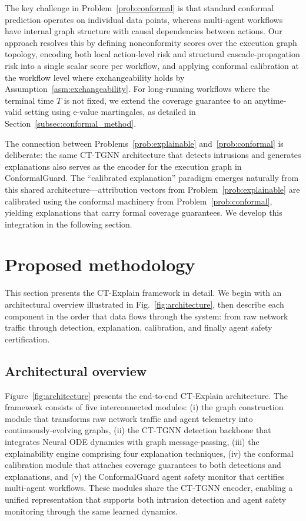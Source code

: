 \documentclass[preprint,review,12pt]{elsarticle}
\begin{document}
The key challenge in Problem~\ref{prob:conformal} is that standard conformal prediction operates on individual data points, whereas multi-agent workflows have internal graph structure with causal dependencies between actions. Our approach resolves this by defining nonconformity scores over the execution graph topology, encoding both local action-level risk and structural cascade-propagation risk into a single scalar score per workflow, and applying conformal calibration at the workflow level where exchangeability holds by Assumption~\ref{asm:exchangeability}. For long-running workflows where the terminal time $T$ is not fixed, we extend the coverage guarantee to an anytime-valid setting using e-value martingales, as detailed in Section~\ref{subsec:conformal_method}.

The connection between Problems~\ref{prob:explainable} and~\ref{prob:conformal} is deliberate: the same CT-TGNN architecture that detects intrusions and generates explanations also serves as the encoder for the execution graph in ConformalGuard. The ``calibrated explanation'' paradigm emerges naturally from this shared architecture---attribution vectors from Problem~\ref{prob:explainable} are calibrated using the conformal machinery from Problem~\ref{prob:conformal}, yielding explanations that carry formal coverage guarantees. We develop this integration in the following section.


\section{Proposed methodology}
\label{sec:methodology}

This section presents the CT-Explain framework in detail. We begin with an architectural overview illustrated in Fig.~\ref{fig:architecture}, then describe each component in the order that data flows through the system: from raw network traffic through detection, explanation, calibration, and finally agent safety certification.

\subsection{Architectural overview}

Figure~\ref{fig:architecture} presents the end-to-end CT-Explain architecture. The framework consists of five interconnected modules: (i) the graph construction module that transforms raw network traffic and agent telemetry into continuously-evolving graphs, (ii) the CT-TGNN detection backbone that integrates Neural ODE dynamics with graph message-passing, (iii) the explainability engine comprising four explanation techniques, (iv) the conformal calibration module that attaches coverage guarantees to both detections and explanations, and (v) the ConformalGuard agent safety monitor that certifies multi-agent workflows. These modules share the CT-TGNN encoder, enabling a unified representation that supports both intrusion detection and agent safety monitoring through the same learned dynamics.
\end{document}
